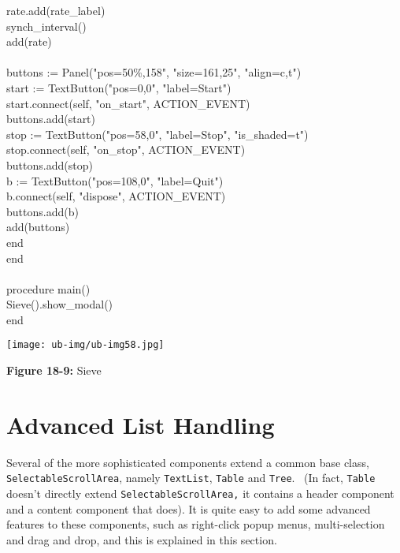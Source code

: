 {\>\>rate.add(rate\_label) \\
\>\>synch\_interval() \\
\>\>add(rate) \\
\ \\
\>\>buttons := Panel("pos=50\%,158", "size=161,25", "align=c,t") \\
\>\>start := TextButton("pos=0,0", "label=Start") \\
\>\>start.connect(self, "on\_start", ACTION\_EVENT) \\
\>\>buttons.add(start) \\
\>\>stop := TextButton("pos=58,0", "label=Stop", "is\_shaded=t") \\
\>\>stop.connect(self, "on\_stop", ACTION\_EVENT) \\
\>\>buttons.add(stop) \\
\>\>b := TextButton("pos=108,0", "label=Quit") \\
\>\>b.connect(self, "dispose", ACTION\_EVENT) \\
\>\>buttons.add(b) \\
\>\>add(buttons) \\
\>end \\
end \\
\ \\
procedure main() \\
\>Sieve().show\_modal() \\
end
}

\bigskip

\begin{center}
\texttt{[image: ub-img/ub-img58.jpg]}
\end{center}

{\sffamily\bfseries Figure 18-9:}
{\sffamily Sieve}

\section{Advanced List Handling}

Several of the more sophisticated components extend a common base class,
\texttt{SelectableScrollArea}, namely \texttt{TextList}, \texttt{Table}
and \texttt{Tree}. \ (In fact, \texttt{Table} doesn't
directly extend \texttt{SelectableScrollArea,} it contains a header
component and a content component that does). It is quite easy to add
some advanced features to these components, such as right-click popup
menus, multi-selection and drag and drop, and this is explained in this
section.

